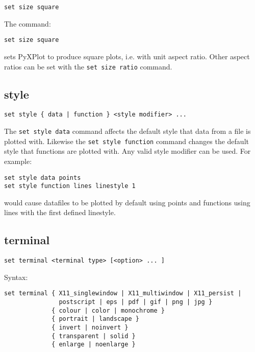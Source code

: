 \begin{verbatim}
set size square
\end{verbatim}

The command:

\begin{verbatim}
set size square
\end{verbatim}

\noindent sets PyXPlot to produce square plots, i.e. with unit aspect ratio. Other aspect
ratios can be set with the {\tt set size ratio} command.

\subsection{style}

\begin{verbatim}
set style { data | function } <style modifier> ...
\end{verbatim}

The {\tt set style data} command affects the default style that data from a file
is plotted with.  Likewise the {\tt set style function} command changes the
default style that functions are plotted with.  Any valid style modifier can be
used.  For example:

\begin{verbatim}
set style data points
set style function lines linestyle 1
\end{verbatim}

\noindent would cause datafiles to be plotted by default using points and
functions using lines with the first defined linestyle.
 
\subsection{terminal}

\begin{verbatim}
set terminal <terminal type> [<option> ... ]
\end{verbatim}

Syntax:

\begin{verbatim}
set terminal { X11_singlewindow | X11_multiwindow | X11_persist | 
               postscript | eps | pdf | gif | png | jpg } 
             { colour | color | monochrome } 
             { portrait | landscape } 
             { invert | noinvert } 
             { transparent | solid }
             { enlarge | noenlarge }
\end{verbatim}

